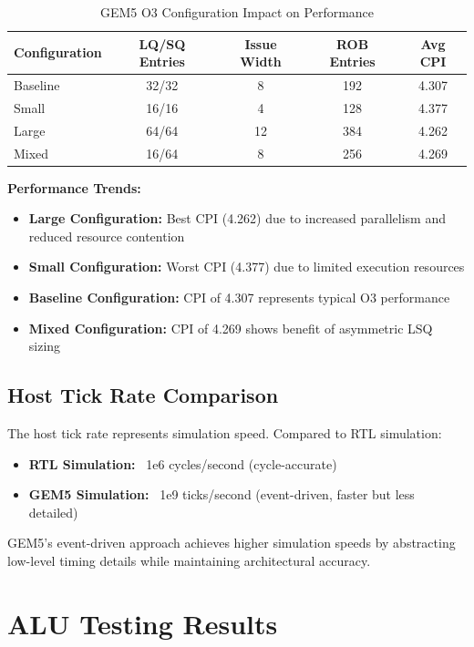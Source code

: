 \documentclass[11pt]{article}
\begin{document}
\begin{table}[h]
\centering
\caption{GEM5 O3 Configuration Impact on Performance}
\label{tab:gem5_configs}
\begin{tabular}{@{}lcccc@{}}
\toprule
Configuration & LQ/SQ Entries & Issue Width & ROB Entries & Avg CPI \\
\midrule
Baseline      & 32/32         & 8           & 192         & 4.307 \\
Small         & 16/16         & 4           & 128         & 4.377 \\
Large         & 64/64         & 12          & 384         & 4.262 \\
Mixed         & 16/64         & 8           & 256         & 4.269 \\
\bottomrule
\end{tabular}
\end{table}

\textbf{Performance Trends:}
\begin{itemize}
    \item \textbf{Large Configuration:} Best CPI (4.262) due to increased parallelism and reduced resource contention
    \item \textbf{Small Configuration:} Worst CPI (4.377) due to limited execution resources
    \item \textbf{Baseline Configuration:} CPI of 4.307 represents typical O3 performance
    \item \textbf{Mixed Configuration:} CPI of 4.269 shows benefit of asymmetric LSQ sizing
\end{itemize}

\subsection{Host Tick Rate Comparison}

The host tick rate represents simulation speed. Compared to RTL simulation:
\begin{itemize}
    \item \textbf{RTL Simulation:} ~1e6 cycles/second (cycle-accurate)
    \item \textbf{GEM5 Simulation:} ~1e9 ticks/second (event-driven, faster but less detailed)
\end{itemize}

GEM5's event-driven approach achieves higher simulation speeds by abstracting low-level timing details while maintaining architectural accuracy.

\section{ALU Testing Results}
\end{document}

